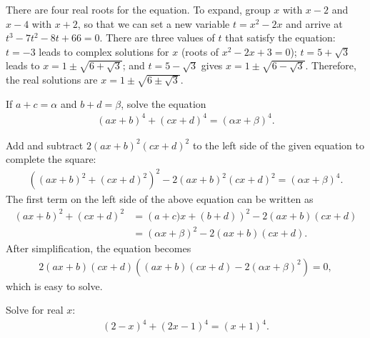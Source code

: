 \begin{solution}[name=Solution by Parviz Shahriari]
There are four real roots for the equation. To expand, group $x$ with $x-2$ and $x-4$ with $x+2$, so that we can set a new variable $t=x^2-2x$ and arrive at $t^3-7t^2-8t+66=0$. There are three values of $t$ that satisfy the equation: $t=-3$ leads to complex solutions for $x$ (roots of $x^2-2x+3=0$); $t=5 + \sqrt 3$ leads to $x=1 \pm \sqrt{6+\sqrt{3}}$; and $t=5 - \sqrt 3$ gives $x=1 \pm \sqrt{6-\sqrt{3}}$. Therefore, the real solutions are  $x=1 \pm \sqrt{6 \pm \sqrt{3}}$.
\end{solution}


\begin{tcolorbox}
\begin{question}
If $a+c = \alpha$ and $b+d = \beta$, solve the equation
\begin{align*}
    (ax+b)^4 + (cx+d)^4 = (\alpha x + \beta)^4.
\end{align*}
\end{question}
\end{tcolorbox}

\begin{solution}[name=Solution by Parviz Shahriari]
Add and subtract $2(ax+b)^2(cx+d)^2$ to the left side of the given equation to complete the square:
\begin{align*}
    \left((ax+b)^2 + (cx+d)^2\right)^2 - 2(ax+b)^2(cx+d)^2 = (\alpha x + \beta)^4.
\end{align*}
The first term on the left side of the above equation can be written as
\begin{align*}
    (ax+b)^2 + (cx+d)^2 &= \left(a+c)x + (b+d)\right)^2 - 2(ax+b)(cx+d)\\
                        &= (\alpha x + \beta)^2 - 2(ax+b)(cx+d).
\end{align*}
After simplification, the equation becomes
\begin{align*}
    2(ax+b)(cx+d)\left((ax+b)(cx+d)-2(\alpha x + \beta)^2\right) = 0,
\end{align*}
which is easy to solve.
\end{solution}



\begin{tcolorbox}
\begin{question}
Solve for real $x$:
\begin{align*}
    (2-x)^4 + (2x-1)^4 = (x+1)^4.
\end{align*}
\end{question}
\end{tcolorbox}

